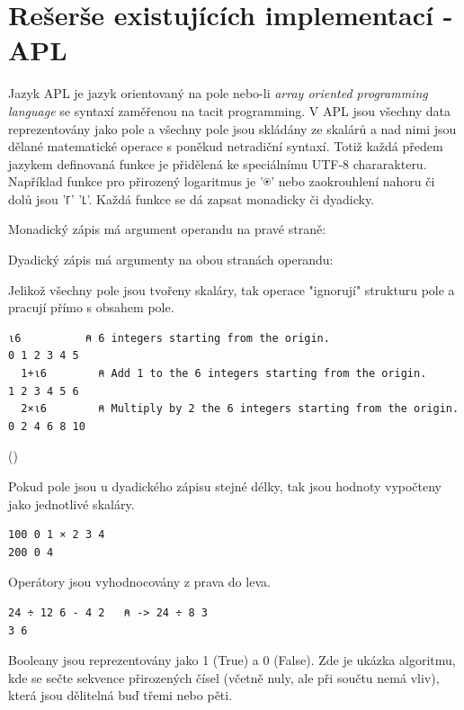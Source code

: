 \documentclass[male,czech]{kithesis}
\newcommand{\aplInline}[1]{\colorbox{gray!10}{{\apl{#1}}}}
\begin{document}
\section{Rešerše existujících implementací - APL}

Jazyk APL je jazyk orientovaný na pole nebo-li \textit{array oriented programming language} se 
syntaxí zaměřenou na tacit programming. V APL jsou všechny data reprezentovány jako pole 
a všechny pole jsou skládány ze skalárů a nad 
nimi jsou dělané matematické operace s poněkud netradiční syntaxí. Totiž každá 
předem jazykem definovaná funkce je přidělená ke speciálnímu UTF-8 chararakteru. 
Například funkce pro přirozený logaritmus je {\apl '⍟'} nebo zaokrouhlení nahoru či dolů 
jsou {\apl '⌈' '⌊'}.
Každá funkce se dá zapsat monadicky či dyadicky. 

Monadický zápis má argument operandu na pravé straně:
\aplInline{-5    ⍝ monadic}

Dyadický zápis má argumenty na obou stranách operandu:
\aplInline{10-7  ⍝ dyadic}

Jelikož všechny pole jsou tvořeny skaláry, tak operace "ignorují" strukturu pole a pracují přímo 
s obsahem pole.

\begin{lstlisting}[language=apl,extendedchars=true]
  ⍳6          ⍝ 6 integers starting from the origin.
0 1 2 3 4 5
  1+⍳6        ⍝ Add 1 to the 6 integers starting from the origin.
1 2 3 4 5 6
  2×⍳6        ⍝ Multiply by 2 the 6 integers starting from the origin.
0 2 4 6 8 10
\end{lstlisting} 
(\cite{WhyAPLIsWorthKnowing})

Pokud pole jsou u dyadického zápisu stejné délky, tak jsou hodnoty vypočteny jako jednotlivé 
skaláry.

\begin{lstlisting}[language=apl,extendedchars=true]
  100 0 1 × 2 3 4
200 0 4
\end{lstlisting}

Operátory jsou vyhodnocovány z prava do leva.

\begin{lstlisting}[language=apl,extendedchars=true]
  24 ÷ 12 6 - 4 2   ⍝ -> 24 ÷ 8 3
3 6
\end{lstlisting}

Booleany jsou reprezentovány jako 1 (True) a 0 (False). Zde je ukázka algoritmu, kde 
se sečte sekvence přirozených čísel (včetně nuly, ale při součtu nemá vliv), 
která jsou dělitelná buď třemi nebo pěti.
\end{document}
